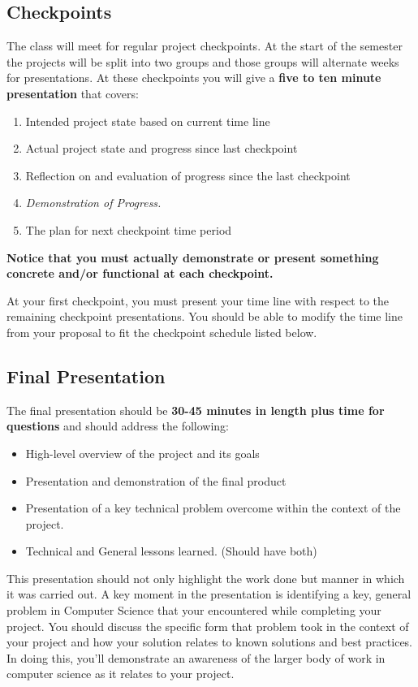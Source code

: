 \documentclass[10pt]{article}
\begin{document}
\subsection{Checkpoints}

The class will meet for regular project checkpoints. At the start of the semester the projects will be split into two groups and those groups will alternate weeks for presentations. At these checkpoints you will give a \textbf{five to ten minute presentation} that covers:
\begin{enumerate}
\item Intended project state based on current time line
\item Actual project state and progress since last checkpoint
\item Reflection on and evaluation of progress since the last checkpoint
\item \textit{Demonstration of Progress.} 
\item The plan for next checkpoint time period
\end{enumerate}
\textbf{Notice that you must actually demonstrate or present something concrete and/or functional at each checkpoint.} 

At your first checkpoint, you must present your time line with respect to the remaining checkpoint presentations. You should be able to modify the time line from your proposal to fit the checkpoint schedule listed below.


\subsection{Final Presentation}
 
The final presentation should be \textbf{30-45 minutes in length plus time for questions} and should address the following:
\begin{itemize}
\item High-level overview of the project and its goals
\item Presentation and demonstration of the final product
\item Presentation of a key technical problem overcome within the context of the project.
\item Technical and General lessons learned. (Should have both)
\end{itemize}
This presentation should not only highlight the work done but manner in which it was carried out.  A key moment in the presentation is identifying a key, general problem in Computer Science that your encountered while completing your project.  You should discuss the specific form that problem took in the context of your project and how your solution relates to known solutions and best practices. In doing this, you'll demonstrate an awareness of the larger body of work in computer science as it relates to your project.
\end{document}
